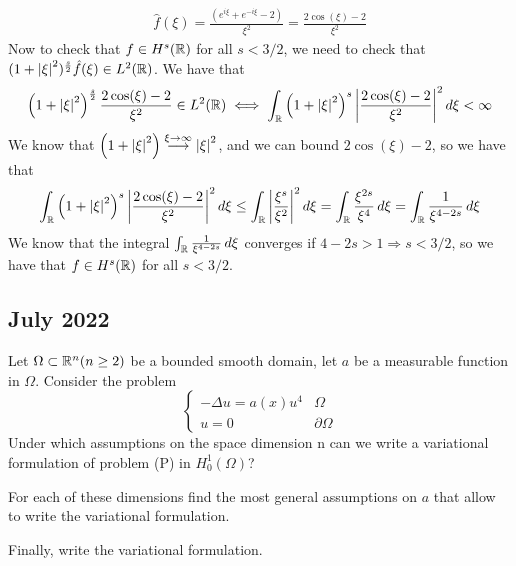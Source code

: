 \[
    \begin{split}
        \hat{f}(\xi) = \frac{(e^{i \xi} + e^{-i \xi} - 2)}{\xi^2} = \frac{2 \cos(\xi) - 2}{\xi^2} 
    \end{split}
\]
Now to check that \(f \in H^s(\mathbb{R})\) for all \(s < 3/2\), we need to check that \((1 + \abs{\xi}^2)^{\frac{s}{2}} \hat{f}(\xi) \in L^2(\mathbb{R})\). We have that
\[
    \begin{split}
        \left(1 + \abs{\xi}^2\right)^{\frac{s}{2}} \frac{2 \cos(\xi) - 2}{\xi^2}  \in L^2(\mathbb{R}) \iff \int_{\mathbb{R}} \left(1 + \abs{\xi}^2\right)^{s} \abs{\frac{2 \cos(\xi) - 2}{\xi^2}}^2 \, d\xi < \infty
    \end{split}
\]
We know that \(\left(1 + \abs{\xi}^2\right) \overset{\xi \to \infty}{\longrightarrow} \abs{\xi}^2\), and we can bound \(2 \cos(\xi) - 2\), so we have that
\[
    \begin{split}
        \int_{\mathbb{R}} \left(1 + \abs{\xi}^2\right)^{s} \abs{\frac{2 \cos(\xi) - 2}{\xi^2}}^2 \, d\xi  \leq
        \int_{\mathbb{R}} \abs{\frac{\xi^{s}}{\xi^2}}^2 \, d\xi = \int_{\mathbb{R}} \frac{\xi^{2s}}{\xi^4} \, d\xi  
        = \int_{\mathbb{R}} \frac{1}{\xi^{4 - 2s}} \, d\xi
    \end{split}
\]
We know that the integral \(\int_{\mathbb{R}} \frac{1}{\xi^{4 - 2s}} \, d\xi\) converges if \(4 - 2s > 1 \Rightarrow s < 3/2\), so we have that \(f \in H^s(\mathbb{R})\) for all \(s < 3/2\). 

\newpage
\subsection{July 2022}
\begin{exercise}
    Let \(\Omega \subset \mathbb{R}^n (n \geq 2)\) be a bounded smooth domain, let \(a\) be a measurable function in \(\Omega\).
    Consider the problem
    \[
        \begin{cases}
            - \Delta u = a(x) u^4 & \Omega \\
            u = 0 & \partial\Omega
        \end{cases}
        \tag*{(P)}
    \]
    Under which assumptions on the space dimension n can we write a variational formulation of problem (P) in
    \(H^1_0(\Omega)\)? 
    
    For each of these dimensions find the most general assumptions on \(a\) that allow to write the variational formulation. 
    
    Finally, write the variational formulation.
    \end{exercise}

